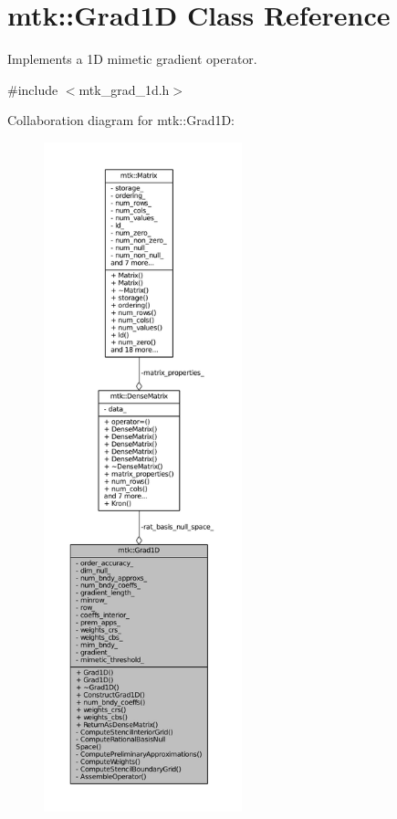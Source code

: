 \hypertarget{classmtk_1_1Grad1D}{\section{mtk\-:\-:Grad1\-D Class Reference}
\label{classmtk_1_1Grad1D}
}


Implements a 1\-D mimetic gradient operator.  




{\ttfamily \#include $<$mtk\-\_\-grad\-\_\-1d.\-h$>$}



Collaboration diagram for mtk\-:\-:Grad1\-D\-:
\nopagebreak
\begin{figure}[H]
\begin{center}
\leavevmode
\includegraphics[height=550pt]{classmtk_1_1Grad1D__coll__graph}
\end{center}
\end{figure}
